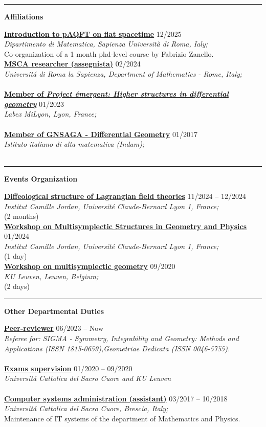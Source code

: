 \documentclass[a4paper]{article}
\newcommand{\block}[1]{\hrule \vspace{0.2cm} \textbf{\Large #1} \vspace{0.2cm}}
\newcommand{\voice}[5]{\href{#4}{\textbf{#1}} \hfill #2 \\ \textit{#3} \\ {\small #5} \vspace{0.2cm} \\}
\begin{document}
	\block{Affiliations}

    \voice{Introduction to pAQFT on flat spacetime}
        {12/2025}
        {Dipartimento di Matematica, Sapienza Università di Roma, Ialy;}
        {https://www.antoniomiti.it/teaching/aqft-2025/}       
        {Co-organization of a 1 month phd-level course by Fabrizio Zanello.}	
	\voice{MSCA researcher (assegnista)}
		{02/2024}
		{Universit\'a di Roma la Sapienza, Department of Mathematics - Rome, Italy;}
		{https://www.mat.uniroma1.it/persone/miti}       
		{\vspace{-0.5cm}}
	\voice{Member of \emph{Project \'emergent: Higher structures in differential geometry}}
		{01/2023}
		{Labex MiLyon, Lyon, France;}
		{https://www.dropbox.com/s/36kh0vre45r38b2/2301-MiLyon-HigherGeometry.pdf?dl=0}       
		{\vspace{-0.5cm}}
	\voice{Member of GNSAGA - Differential Geometry}
		{01/2017}
		{Istituto italiano di alta matematica (Indam);}
		{https://web.archive.org/web/20170924125645/http://www.altamatematica.it/gnsaga/node/23}       
		{\vspace{-0.5cm}}

	\block{Events Organization}

	\voice{Diffeological structure of Lagrangian field theories}
		{11/2024 -- 12/2024}
		{Institut Camille Jordan, Université Claude-Bernard Lyon 1, France;}
		{https://www.antoniomiti.it/teaching/LFT-2024/}       
		{(2 months)}
	\voice{Workshop on Multisymplectic Structures in Geometry and Physics}
		{01/2024}
		{Institut Camille Jordan, Université Claude-Bernard Lyon 1, France;}
		{https://math.gmu.edu/~cblacke/lyon.html}       
		{(1 day)}
	\voice{Workshop on multisymplectic geometry}
		{09/2020}
		{KU Leuven, Leuven, Belgium;}
		{https://wis.kuleuven.be/events/multisymplectic}       
		{(2 days)}

	\block{Other Departmental Duties}

	\voice{Peer-reviewer}
		{06/2023 -- Now}
		{Referee for: SIGMA - Symmetry, Integrability and Geometry: Methods and Applications (ISSN 1815-0659),Geometriae Dedicata (ISSN 0046-5755).}
		{}
        {\vspace{-0.5cm}}
	\voice{Exams supervision}
		{01/2020 -- 09/2020}
		{Universit\'a Cattolica del Sacro Cuore and KU Leuven}
		{}       
		{\vspace{-0.5cm}}
	\voice{Computer systems administration (assistant)}
		{03/2017 -- 10/2018}
		{Universit\'a Cattolica del Sacro Cuore, Brescia, Italy;}
		{https://dipartimenti.unicatt.it/dmf-home}       
		{Maintenance of IT systems of the department of Mathematics and Physics.}
\end{document}
